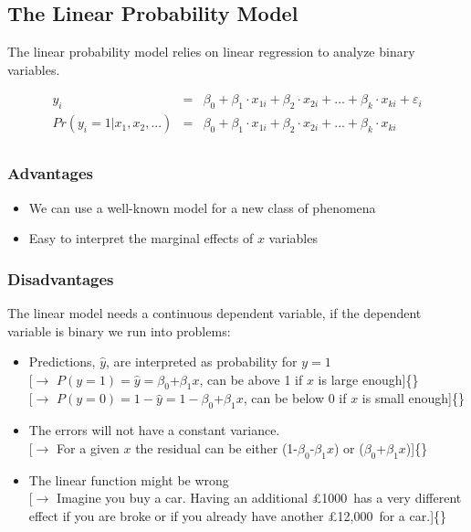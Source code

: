 \documentclass[]{article}
\providecommand{\tightlist}{%
  \setlength{\itemsep}{0pt}\setlength{\parskip}{0pt}}
\theoremstyle{definition}
\theoremstyle{definition}
\theoremstyle{remark}
\begin{document}
\subsection{The Linear Probability
Model}\label{the-linear-probability-model}

The linear probability model relies on linear regression to analyze
binary variables.

\begin{eqnarray}
y_i & = & \beta_0 + \beta_1 \cdot x_{1i} + \beta_2 \cdot x_{2i}+ ... + \beta_k \cdot x_{ki} + \varepsilon_{i}\\
Pr(y_i=1|x_1, x_2, ...) & = & \beta_0 + \beta_1 \cdot x_{1i} + \beta_2 \cdot x_{2i}+ ... + \beta_k \cdot x_{ki} \\
\end{eqnarray}

\subsubsection{Advantages}\label{advantages}

\begin{itemize}
\tightlist
\item
  We can use a well-known model for a new class of phenomena
\item
  Easy to interpret the marginal effects of \(x\) variables
\end{itemize}

\subsubsection{Disadvantages}\label{disadvantages}

The linear model needs a continuous dependent variable, if the dependent
variable is binary we run into problems:

\begin{itemize}
\item
  Predictions, \(\hat y\), are interpreted as probability for \(y=1\)\\
  {[}\(\rightarrow\) \(P(y=1) = \hat y = \beta_0\)+\(\beta_1 x\), can be
  above 1 if \(x\) is large enough{]}\{\}\\
  {[}\(\rightarrow\) \(P(y=0) = 1- \hat y = 1 - \beta_0\)+\(\beta_1 x\),
  can be below 0 if \(x\) is small enough{]}\{\}
\item
  The errors will not have a constant variance.\\
  {[}\(\rightarrow\) For a given \(x\) the residual can be either
  (1-\(\beta_0\)-\(\beta_1 x\)) or (\(\beta_0\)+\(\beta_1 x\)){]}\{\}
\item
  The linear function might be wrong\\
  {[}\(\rightarrow\) Imagine you buy a car. Having an additional
  £1000~has a very different effect if you are broke or if you already
  have another £12,000~for a car.{]}\{\}
\end{itemize}
\end{document}
